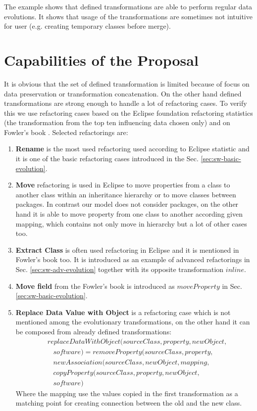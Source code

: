 \documentclass[runningheads]{comsis}
\begin{document}
The example shows that defined transformations are able to perform regular data evolutions. It shows that usage of the transformations are sometimes not intuitive for user (e.g. creating temporary classes before merge).

\section{Capabilities of the Proposal}
\label{sec:case}
It is obvious that the set of defined transformation is limited because of focus on data preservation or transformation concatenation. On the other hand defined transformations are strong enough to handle a lot of refactoring cases. To verify this we use refactoring cases based on the Eclipse foundation refactoring statistics \cite{Eclipse:Refactoring} (the transformation from the top ten influencing data chosen only) and on Fowler's book \cite{Fowler:Refactoring}. Selected refactorings are:
\begin{enumerate}
	\item \textbf{Rename} is the most used refactoring used according to Eclipse statistic and it is one of the basic refactoring cases introduced in the Sec. \ref{sec:sw-basic-evolution}.
	\item  \textbf{Move} refactoring is used in Eclipse to move properties from a class to another class within an inheritance hierarchy or to move classes between packages. In contrast our model does not consider packages, on the other hand it is able to move property from one class to another according given mapping, which contains not only move in hierarchy but a lot of other cases too.
	\item \textbf{Extract Class} is often used refactoring in Eclipse and it is mentioned in Fowler's book too. It is introduced as an example of advanced refactorings in Sec. \ref{sec:sw-adv-evolution} together with its opposite transformation $inline$.
	\item \textbf{Move field} from the Fowler's book is introduced as $moveProperty$ in Sec. \ref{sec:sw-basic-evolution}.
	\item \textbf{Replace Data Value with Object} is a refactoring case which is not mentioned among the evolutionary transformations, on the other hand it can be composed from already defined transformations:
	\begin{align}
& replaceDataWithObject(sourceClass, property, newObject, \nonumber \\
& \; \; \; software) = removeProperty(sourceClass, property, \nonumber \\
& \; \; \; newAssociation(sourceClass, newObject,  mapping,\nonumber  \\
& \; \; \; copyProperty(sourceClass, property, newObject, \nonumber \\ & \; \; \;  software)
	\end{align}
Where the mapping use the values copied in the first transformation as a matching point for creating connection between the old and the new class.
\end{enumerate}
\end{document}
